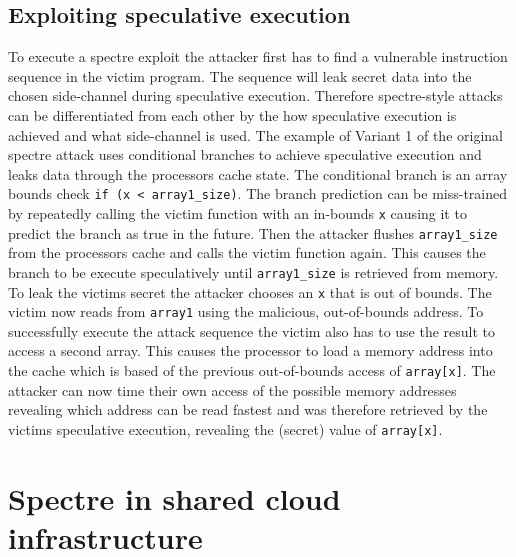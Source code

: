 \documentclass[conference,compsoc,final,a4paper]{IEEEtran}
\begin{document}
\subsection{Exploiting speculative execution}
To execute a spectre exploit the attacker first has to find a vulnerable instruction sequence in the victim program. The sequence will leak secret data into the chosen
side-channel during speculative execution. Therefore spectre-style attacks can be differentiated from each other by the how speculative execution is achieved
and what side-channel is used. \cite{kocher2018spectre} The example of Variant 1 of the original spectre attack uses conditional branches to achieve speculative
execution and leaks data through the processors cache state. The conditional branch is an array bounds check \lstinline|if (x < array1_size)|. The branch prediction
can be miss-trained by repeatedly calling the victim function with an in-bounds \lstinline|x| causing it to predict the branch as true in the future. Then the
attacker flushes \lstinline|array1_size| from the processors cache and calls the victim function again. This causes the branch to be execute speculatively
until \lstinline|array1_size| is retrieved from memory. To leak the victims secret the attacker chooses an \lstinline|x| that is out of bounds. The victim
now reads from \lstinline|array1| using the malicious, out-of-bounds address. To successfully execute the attack sequence the victim also has to use the result to
access a second array. This causes the processor to load a memory address into the cache which is based of the previous out-of-bounds access of \lstinline|array[x]|.
The attacker can now time their own access of the possible memory addresses revealing which address can be read fastest and was therefore retrieved by the victims
speculative execution, revealing the (secret) value of \lstinline|array[x]|.
\section{Spectre in shared cloud infrastructure}
\end{document}
